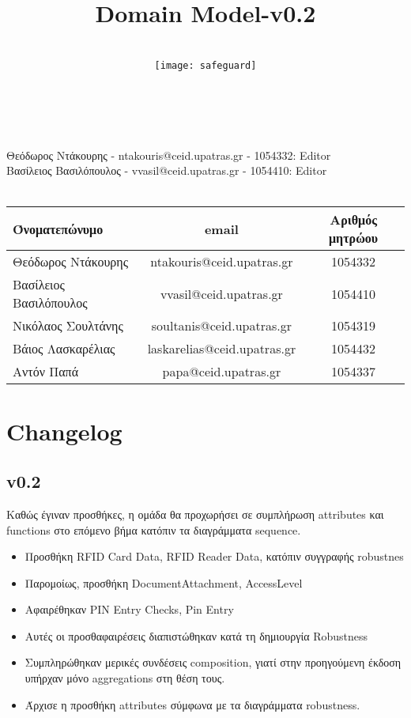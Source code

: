 \documentclass{article}
\title{Domain Model-v0.2}
\author{\\
\texttt{[image: safeguard]}\\[1ex]\\\\
}
\begin{document}
\maketitle

\newpage

Θεόδωρος Ντάκουρης - ntakouris@ceid.upatras.gr - 1054332: Editor \\
Βασίλειος Βασιλόπουλος - vvasil@ceid.upatras.gr - 1054410: Editor \\
\\

\begin{tabular}{|l|c|c|}
\hline
Όνοματεπώνυμο & email & Αριθμός μητρώου  \\
\hline
Θεόδωρος Ντάκουρης & ntakouris@ceid.upatras.gr & 1054332 \\
Βασίλειος Βασιλόπουλος & vvasil@ceid.upatras.gr &  1054410 \\
Νικόλαος Σουλτάνης & soultanis@ceid.upatras.gr & 1054319  \\
Βάιος Λασκαρέλιας & laskarelias@ceid.upatras.gr & 1054432 \\
Αντόν Παπά & papa@ceid.upatras.gr & 1054337 \\
\hline
\end{tabular}

\renewcommand{\contentsname}{Περιεχόμενα}
\tableofcontents

\section{Changelog}
\subsection{v0.2}
Καθώς έγιναν προσθήκες, η ομάδα θα προχωρήσει σε συμπλήρωση attributes και functions στο επόμενο βήμα κατόπιν τα διαγράμματα sequence.

\begin{itemize}
    \item Προσθήκη RFID Card Data, RFID Reader Data, κατόπιν συγγραφής robustnes
    \item Παρομοίως, προσθήκη DocumentAttachment, AccessLevel
    \item Αφαιρέθηκαν PIN Entry Checks, Pin Entry 
    \item Αυτές οι προσθαφαιρέσεις διαπιστώθηκαν κατά τη δημιουργία Robustness
    \item Συμπληρώθηκαν μερικές συνδέσεις composition, γιατί στην προηγούμενη έκδοση υπήρχαν μόνο aggregations στη θέση τους.
    \hline
    \item Άρχισε η προσθήκη attributes σύμφωνα με τα διαγράμματα robustness.
\end{itemize}
\end{document}

